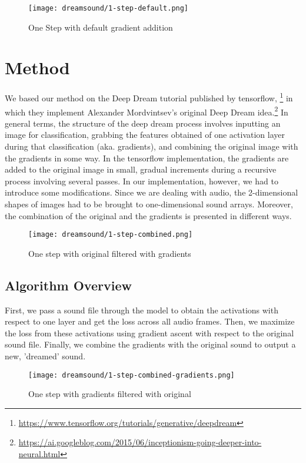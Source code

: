 \documentclass[a4paper,10pt,oneside]{article}
\begin{document}
\begin{sloppy}
\begin{figure*}[htbp]
       \centering
              \texttt{[image: dreamsound/1-step-default.png]}
       \caption{One Step with default gradient addition}
       \label{fig:img-1}
\end{figure*}
\section{Method}
We based our method on the Deep Dream tutorial published by tensorflow, \footnote{\url{https://www.tensorflow.org/tutorials/generative/deepdream}} in which they implement Alexander Mordvintsev's original Deep Dream idea.\footnote{\url{https://ai.googleblog.com/2015/06/inceptionism-going-deeper-into-neural.html}} In general terms, the structure of the deep dream process involves inputting an image for classification,  grabbing the features obtained of one activation layer during that classification (aka. gradients), and combining the original image with the gradients in some way. In the tensorflow implementation, the gradients are added to the original image in small, gradual increments during a recursive process involving several passes. In our implementation, however, we had to introduce some modifications. Since we are dealing with audio, the 2-dimensional shapes of images had to be brought to one-dimensional sound arrays. Moreover, the combination of the original and the gradients is presented in different ways.
\begin{figure*}[htbp]
       \centering
              \texttt{[image: dreamsound/1-step-combined.png]}
       \caption{One step with original filtered with gradients}
       \label{fig:img-2}
\end{figure*}
\subsection{Algorithm Overview}
First, we pass a sound file through the model to obtain the activations with respect to one layer and get the loss across all audio frames. Then, we maximize the loss from these activations using gradient ascent with respect to the original sound file. Finally, we combine the gradients with the original sound to output a new, 'dreamed' sound.


\begin{figure*}[htbp]
       \centering
              \texttt{[image: dreamsound/1-step-combined-gradients.png]}
       \caption{One step with gradients filtered with original}
       \label{fig:img-3}
\end{figure*}




\end{sloppy}
\end{document}
